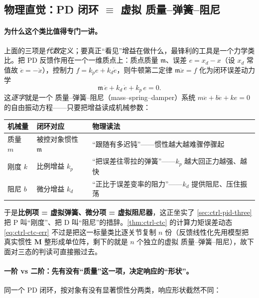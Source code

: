 \subsection{物理直觉：PD 闭环 \texorpdfstring{$\equiv$}{=} 虚拟 质量--弹簧--阻尼}
\label{sec:ctrl-pid-msd}

\paragraph{为什么这个类比值得专门一讲。}
上面的三项是\emph{代数}定义；要真正“看见”增益在做什么，最锋利的工具是一个力学类比\cite{lynch2017modern}。把 PD 反馈作用在一个一维质点上：质点质量 $\mathfrak{m}$、误差 $e=x_d-x$（设 $x_d$ 常值故 $\ddot e=-\ddot x$），控制力 $f=k_pe+k_d\dot e$，则牛顿第二定律 $\mathfrak m\ddot x=f$ 化为闭环误差动力学
\begin{equation}
  \mathfrak m\,\ddot e+k_d\,\dot e+k_p\,e=0.
  \label{eq:ctrl-msd-error}
\end{equation}
这\emph{逐字}就是一个 质量--弹簧--阻尼（mass--spring--damper）系统 $m\ddot e+b\dot e+ke=0$ 的自由振动方程——只要把增益读成机械参数：

\begin{center}\small
\begin{tabular}{lll}
\toprule
机械量 & 闭环对应 & 物理读法 \\
\midrule
质量 $m$ & 被控对象惯性 $\mathfrak m$ & “跟随有多迟钝”——惯性越大越难骤停骤起 \\
刚度 $k$ & 比例增益 $k_p$ & “把误差往零拉的弹簧”——$k_p$ 越大回正力越强、越快 \\
阻尼 $b$ & 微分增益 $k_d$ & “正比于误差变率的阻力”——$k_d$ 提供阻尼、压住振荡 \\
\bottomrule
\end{tabular}
\end{center}

\noindent 于是\textbf{比例项 = 虚拟弹簧、微分项 = 虚拟阻尼器}，这正坐实了 \cref{sec:ctrl-pid-three} 把 P 叫“刚度”、把 D 叫“阻尼”的措辞。\cref{thm:ctrl-ctc} 的计算力矩误差动态 \cref{eq:ctrl-ctc-err} 不过是把这一标量类比逐关节复制 $n$ 份（反馈线性化先用模型把真实惯性 $\mathbf M$ 整形成单位阵，剩下的就是 $n$ 个独立的虚拟 质量--弹簧--阻尼），故下面对三态的判读可直接搬过去。

\paragraph{一阶 vs 二阶：先有没有“质量”这一项，决定响应的“形状”。}
同一个 PD 闭环，按对象有没有显著惯性分两类，响应形状截然不同：

